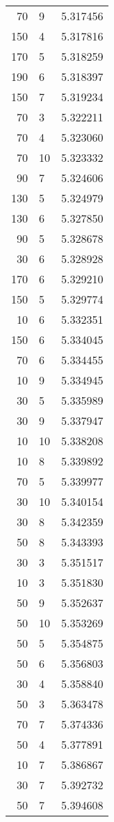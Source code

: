 \begin{tabular}{rlr}
70 & 9 & 5.317456 \\
150 & 4 & 5.317816 \\
170 & 5 & 5.318259 \\
190 & 6 & 5.318397 \\
150 & 7 & 5.319234 \\
70 & 3 & 5.322211 \\
70 & 4 & 5.323060 \\
70 & 10 & 5.323332 \\
90 & 7 & 5.324606 \\
130 & 5 & 5.324979 \\
130 & 6 & 5.327850 \\
90 & 5 & 5.328678 \\
30 & 6 & 5.328928 \\
170 & 6 & 5.329210 \\
150 & 5 & 5.329774 \\
10 & 6 & 5.332351 \\
150 & 6 & 5.334045 \\
70 & 6 & 5.334455 \\
10 & 9 & 5.334945 \\
30 & 5 & 5.335989 \\
30 & 9 & 5.337947 \\
10 & 10 & 5.338208 \\
10 & 8 & 5.339892 \\
70 & 5 & 5.339977 \\
30 & 10 & 5.340154 \\
30 & 8 & 5.342359 \\
50 & 8 & 5.343393 \\
30 & 3 & 5.351517 \\
10 & 3 & 5.351830 \\
50 & 9 & 5.352637 \\
50 & 10 & 5.353269 \\
50 & 5 & 5.354875 \\
50 & 6 & 5.356803 \\
30 & 4 & 5.358840 \\
50 & 3 & 5.363478 \\
70 & 7 & 5.374336 \\
50 & 4 & 5.377891 \\
10 & 7 & 5.386867 \\
30 & 7 & 5.392732 \\
50 & 7 & 5.394608 \\
\bottomrule
\end{tabular}
